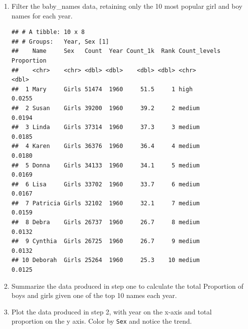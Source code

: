 \documentclass[]{book}
\newenvironment{Shaded}{\begin{snugshade}}{\end{snugshade}}
\newcommand{\CommentTok}[1]{\textcolor[rgb]{0.56,0.35,0.01}{\textit{#1}}}
\newcommand{\DataTypeTok}[1]{\textcolor[rgb]{0.13,0.29,0.53}{#1}}
\newcommand{\DecValTok}[1]{\textcolor[rgb]{0.00,0.00,0.81}{#1}}
\newcommand{\KeywordTok}[1]{\textcolor[rgb]{0.13,0.29,0.53}{\textbf{#1}}}
\newcommand{\NormalTok}[1]{#1}
\newcommand{\OperatorTok}[1]{\textcolor[rgb]{0.81,0.36,0.00}{\textbf{#1}}}
\newcommand{\StringTok}[1]{\textcolor[rgb]{0.31,0.60,0.02}{#1}}
\begin{document}
\begin{enumerate}
\def\labelenumi{\arabic{enumi}.}
\item
  Filter the baby\_names data, retaining only the 10 most popular girl and boy names for each year.

\begin{Shaded}
\end{Shaded}

\begin{verbatim}
## # A tibble: 10 x 8
## # Groups:   Year, Sex [1]
##    Name     Sex   Count  Year Count_1k  Rank Count_levels Proportion
##    <chr>    <chr> <dbl> <dbl>    <dbl> <dbl> <chr>             <dbl>
##  1 Mary     Girls 51474  1960     51.5     1 high             0.0255
##  2 Susan    Girls 39200  1960     39.2     2 medium           0.0194
##  3 Linda    Girls 37314  1960     37.3     3 medium           0.0185
##  4 Karen    Girls 36376  1960     36.4     4 medium           0.0180
##  5 Donna    Girls 34133  1960     34.1     5 medium           0.0169
##  6 Lisa     Girls 33702  1960     33.7     6 medium           0.0167
##  7 Patricia Girls 32102  1960     32.1     7 medium           0.0159
##  8 Debra    Girls 26737  1960     26.7     8 medium           0.0132
##  9 Cynthia  Girls 26725  1960     26.7     9 medium           0.0132
## 10 Deborah  Girls 25264  1960     25.3    10 medium           0.0125
\end{verbatim}
\item
  Summarize the data produced in step one to calculate the total Proportion of boys and girls given one of the top 10 names each year.

\begin{Shaded}
\end{Shaded}
\item
  Plot the data produced in step 2, with year on the x-axis and total proportion on the y axis. Color by \texttt{Sex} and notice
  the trend.


\end{enumerate}
\end{document}

